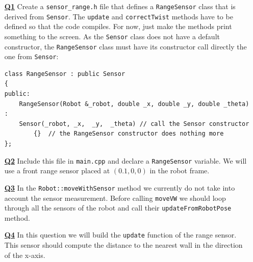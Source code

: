 \documentclass{ecnreport}
\begin{document}
\begin{itemize}
\medskip\item[\textbf{\underline{Q1}}] Create a \texttt{sensor\_range.h} file that defines a \texttt{RangeSensor} class that is derived from \texttt{Sensor}. The \texttt{update} and \texttt{correctTwist} methods have to be defined so that the code compiles. For now, just make the methods print something to the screen.
As the \texttt{Sensor} class does not have a default constructor, the \texttt{RangeSensor} class must have its constructor call directly the one from  \texttt{Sensor}:
\begin{center}\cppstyle
\begin{lstlisting}
class RangeSensor : public Sensor
{
public:
    RangeSensor(Robot &_robot, double _x, double _y, double _theta) :
	Sensor(_robot, _x,  _y,  _theta) // call the Sensor constructor
        {}	// the RangeSensor constructor does nothing more
};    
\end{lstlisting}
\end{center}

\medskip\item[\textbf{\underline{Q2}}] Include this file in \texttt{main.cpp} and declare a \texttt{RangeSensor} variable.  We will use a front range sensor placed at $(0.1, 0,0)$ in the robot frame.

\medskip\item[\textbf{\underline{Q3}}] In the \texttt{Robot::moveWithSensor} method we currently do not take into account the sensor measurement. 
Before calling \texttt{moveVW} we should loop through all the sensors of the robot and call their \texttt{updateFromRobotPose} method.

\medskip\item[\textbf{\underline{Q4}}] In this question we will build the \texttt{update} function of the range sensor.
This sensor should compute the distance to the nearest wall in the direction of the x-axis.\\


\end{itemize}
\end{document}
